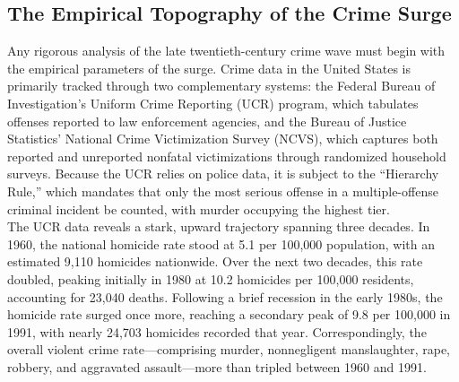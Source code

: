 \documentclass[
]{article}
\begin{document}
\subsection{\texorpdfstring{\textbf{The Empirical Topography of the
Crime
Surge}}{The Empirical Topography of the Crime Surge}}\label{the-empirical-topography-of-the-crime-surge}

Any rigorous analysis of the late twentieth-century crime wave must
begin with the empirical parameters of the surge. Crime data in the
United States is primarily tracked through two complementary systems:
the Federal Bureau of Investigation's Uniform Crime Reporting (UCR)
program, which tabulates offenses reported to law enforcement agencies,
and the Bureau of Justice Statistics' National Crime Victimization
Survey (NCVS), which captures both reported and unreported nonfatal
victimizations through randomized household surveys. Because the UCR
relies on police data, it is subject to the ``Hierarchy Rule,'' which
mandates that only the most serious offense in a multiple-offense
criminal incident be counted, with murder occupying the highest tier.\\
The UCR data reveals a stark, upward trajectory spanning three decades.
In 1960, the national homicide rate stood at 5.1 per 100,000 population,
with an estimated 9,110 homicides nationwide. Over the next two decades,
this rate doubled, peaking initially in 1980 at 10.2 homicides per
100,000 residents, accounting for 23,040 deaths. Following a brief
recession in the early 1980s, the homicide rate surged once more,
reaching a secondary peak of 9.8 per 100,000 in 1991, with nearly 24,703
homicides recorded that year. Correspondingly, the overall violent crime
rate---comprising murder, nonnegligent manslaughter, rape, robbery, and
aggravated assault---more than tripled between 1960 and 1991.
\end{document}
